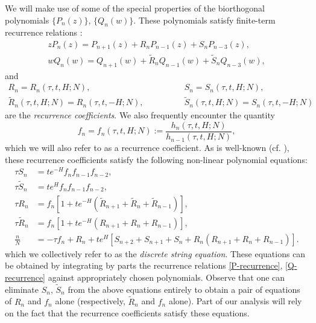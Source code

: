 \documentclass[usenames,dvipsnames]{article}
\theoremstyle{definition}
\numberwithin{equation}{section}
\numberwithin{figure}{section}
\begin{document}
We will make use of some of the special properties of the biorthogonal polynomials $\{P_n(z)\}$, $\{Q_n(w)\}$. These polynomials satisfy finite-term recurrence relations \cite{Mehta,Kazakov1} :
    \begin{align}
        zP_n(z) = P_{n+1}(z) + R_nP_{n-1}(z) + S_nP_{n-3}(z), \label{P-recurrence}\\
        wQ_n(w) = Q_{n+1}(w) + \tilde{R}_nQ_{n-1}(w) + \tilde{S}_nQ_{n-3}(w),\label{Q-recurrence}
    \end{align}
and 
    \begin{align*}
        R_n = R_n(\tau,t,H;N), \qquad&\qquad S_n = S_n(\tau,t,H;N),\\
        \tilde{R}_n(\tau,t,H;N) = R_n(\tau,t,-H;N), \qquad&\qquad \tilde{S}_n(\tau,t,H;N) = S_n(\tau,t,-H;N)
    \end{align*}
are the \textit{recurrence coefficients}. We also frequently encounter the quantity
    \begin{equation}
        f_n = f_n(\tau,t,H;N):= \frac{h_n(\tau,t,H;N)}{h_{n-1}(\tau,t,H;N)},
    \end{equation}
which we will also refer to as a recurrence coefficient. As is well-known (cf. \cite{Mehta,Kazakov1,Kazakov2}), these recurrence coefficients satisfy 
the following non-linear polynomial equations:
        \begin{align}
            \tau S_n &= te^{-H}f_nf_{n-1}f_{n-2},\label{dString-a}\\
            \tau \tilde{S}_n &= te^{H}f_nf_{n-1}f_{n-2},\\
            \tau R_n &= f_n[1 + te^{-H}(\tilde{R}_{n+1} + \tilde{R}_{n} + \tilde{R}_{n-1})],\\
            \tau \tilde{R}_n &= f_n[1 + te^{-H}(R_{n+1} + R_{n} + R_{n-1})],\\
            \frac{n}{N} &= -\tau f_n + R_n + te^{H}[S_{n+2} + S_{n+1} + S_{n} + R_n(R_{n+1}+R_{n}+R_{n-1})].\label{dString}
        \end{align}
which we collectively refer to as the \textit{discrete string equation}. These equations can be obtained by integrating by parts the recurrence relations \eqref{P-recurrence}, \eqref{Q-recurrence} against appropriately chosen polynomials. Observe that one can eliminate $S_n$, $\tilde{S}_n$ from the above equations entirely to obtain a pair of equations of $R_n$ and $f_n$ alone (respectively, $\tilde{R}_n$ and $f_n$ alone). Part of our analysis will rely on the fact that the recurrence coefficients satisfy these equations.
\end{document}
